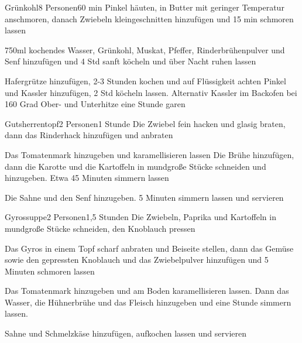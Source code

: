 \begin{recipe}{Grünkohl}{8 Personen}{60 min}
Pinkel häuten, in Butter mit geringer Temperatur anschmoren, danach Zwiebeln kleingeschnitten hinzufügen und 15 min schmoren lassen

750ml kochendes Wasser, Grünkohl, Muskat, Pfeffer, Rinderbrühenpulver und Senf hinzufügen und 4 Std sanft köcheln und über Nacht ruhen lassen

Hafergrütze hinzufügen, 2-3 Stunden kochen und auf Flüssigkeit achten
Pinkel und Kassler hinzufügen, 2 Std köcheln lassen. Alternativ Kassler im Backofen bei 160 Grad Ober- und Unterhitze eine Stunde garen
\end{recipe}


\begin{recipe}{Gutsherrentopf}{2 Personen}{1 Stunde}
Die Zwiebel fein hacken und glasig braten, dann das Rinderhack hinzufügen und anbraten

Das Tomatenmark hinzugeben und karamellisieren lassen
Die Brühe hinzufügen, dann die Karotte und die Kartoffeln in mundgroße Stücke schneiden und hinzugeben. Etwa 45 Minuten simmern lassen 

Die Sahne und den Senf hinzugeben.
5 Minuten simmern lassen und servieren
\end{recipe}


\begin{recipe}{Gyrossuppe}{2 Personen}{1,5 Stunden}
Die Zwiebeln, Paprika und Kartoffeln in mundgroße Stücke schneiden, den Knoblauch pressen

Das Gyros in einem Topf scharf anbraten und Beiseite stellen, dann das Gemüse sowie den gepressten Knoblauch und das Zwiebelpulver hinzufügen und 5 Minuten schmoren lassen

Das Tomatenmark hinzugeben und am Boden karamellisieren lassen. Dann das Wasser, die Hühnerbrühe und das Fleisch hinzugeben und eine Stunde simmern lassen.

Sahne und Schmelzkäse hinzufügen, aufkochen lassen und servieren
\end{recipe}

